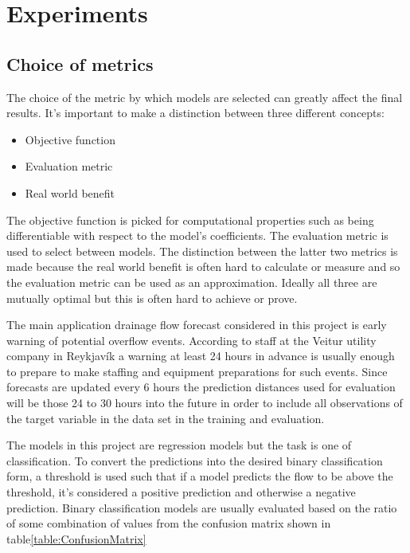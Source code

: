 \section{Experiments}
\subsection{Choice of metrics}
The choice of the metric by which models are selected can greatly affect the final results. It's important to make a distinction between three different concepts:
\begin{itemize}
\item Objective function
\item Evaluation metric
\item Real world benefit
\end{itemize}
The objective function is picked for computational properties such as being differentiable with respect to the model's coefficients. The evaluation metric is used to select between models. The distinction between the latter two metrics is made because the real world benefit is often hard to calculate or measure and so the evaluation metric can be used as an approximation. Ideally all three are mutually optimal but this is often hard to achieve or prove. 

The main application drainage flow forecast considered in this project is early warning of potential overflow events. According to staff at the Veitur utility company in Reykjavík a warning at least 24 hours in advance is usually enough to prepare to make staffing and equipment preparations for such events. Since forecasts are updated every 6 hours the prediction distances used for evaluation will be those 24 to 30 hours into the future in order to include all observations of the target variable in the data set in the training and evaluation.

The models in this project are regression models but the task is one of classification. To convert the predictions into the desired binary classification form, a threshold is used such that if a model predicts the flow to be above the threshold, it's considered a positive prediction and otherwise a negative prediction. Binary classification models are usually evaluated based on the ratio of some combination of values from the confusion matrix shown in table\ref{table:ConfusionMatrix}

